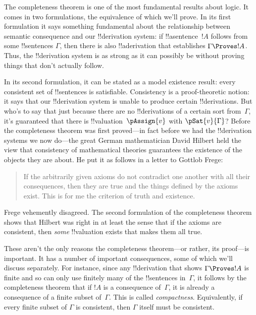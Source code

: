 




The completeness theorem is one of the most fundamental results about
logic.  It comes in two formulations, the equivalence of which we'll
prove.  In its first formulation it says something fundamental about
the relationship between semantic consequence and our !!{derivation}
system: if !!a{sentence}~$!A$ follows from some !!{sentence}s
$\Gamma$, then there is also !!a{derivation} that establishes $\Gamma
\Proves !A$. Thus, the !!{derivation} system is as strong as it can
possibly be without proving things that don't actually follow.

In its second formulation, it can be stated as a model existence
result: every consistent set of !!{sentence}s is satisfiable.
Consistency is a proof-theoretic notion: it says that our
!!{derivation} system is unable to produce certain !!{derivation}s.
But who's to say that just because there are no !!{derivation}s of a
certain sort from~$\Gamma$, it's guaranteed that there is
!!{valuation}{~$\pAssign{v}$}
with $\pSat{v}{\Gamma}$? Before the
completeness theorem was first proved---in fact before we had the
!!{derivation} systems we now do---the great German mathematician
David Hilbert held the view that consistency of mathematical theories
guarantees the existence of the objects they are about. He put it as
follows in a letter to Gottlob Frege:
\begin{quote}
  If the arbitrarily given axioms do not contradict one another with
  all their consequences, then they are true and the things defined by
  the axioms exist. This is for me the criterion of truth and
  existence. 
\end{quote}
Frege vehemently disagreed. The second formulation of the completeness
theorem shows that Hilbert was right in at least the sense that if the
axioms are consistent, then \emph{some}
!!{valuation} exists that makes them all
true.

These aren't the only reasons the completeness theorem---or rather,
its proof---is important.  It has a number of important consequences,
some of which we'll discuss separately.  For instance, since any
!!{derivation} that shows $\Gamma \Proves !A$ is finite and so can
only use finitely many of the !!{sentence}s in~$\Gamma$, it follows by
the completeness theorem that if $!A$ is a consequence of~$\Gamma$, it
is already a consequence of a finite subset of~$\Gamma$.  This is
called \emph{compactness}.  Equivalently, if every finite subset of
$\Gamma$ is consistent, then $\Gamma$ itself must be consistent.


